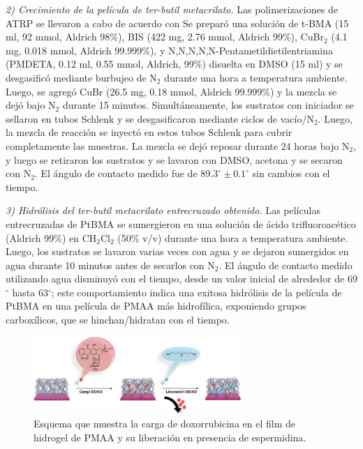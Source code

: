 \emph{2) Crecimiento de la pel\'icula de ter-butil metacrilato.}
 Las polimerizaciones de ATRP se llevaron a cabo de acuerdo con \cite{Brown2009} Se prepar\'o una soluci\'on de t-BMA (15 ml, 92 mmol, Aldrich 98\%), BIS (422 mg, 2.76 mmol, Aldrich 99\%), CuBr$_2$ (4.1 mg, 0.018 mmol, Aldrich 99.999\%), y N,N,N,N,N-Pentametildietilentriamina (PMDETA, 0.12 ml, 0.55 mmol, Aldrich, 99\%) disuelta en DMSO (15 ml) y se desgasific\'o mediante burbujeo de N$_2$ durante una hora a temperatura ambiente. Luego, se agregó CuBr (26.5 mg, 0.18 mmol, Aldrich 99.999\%) y la mezcla se dej\'o bajo N$_2$ durante 15 minutos. Simult\'aneamente, los sustratos con iniciador se sellaron en tubos Schlenk y se desgasificaron mediante ciclos de vac\'io/N$_2$. Luego, la mezcla de reacci\'on se inyect\'o en estos tubos Schlenk para cubrir completamente las muestras. La mezcla se dej\'o reposar durante 24 horas bajo N$_2$, y luego se retiraron los sustratos y se lavaron con DMSO, acetona y se secaron con N$_2$. El \'angulo de contacto medido fue de $89.3^\circ \pm 0.1^\circ$ sin cambios con el tiempo.

\emph{3) Hidr\'olisis del ter-butil metacrilato entrecruzado obtenido.}
 Las pel\'iculas entrecruzadas de PtBMA se sumergieron en una soluci\'on de \'acido trifluoroac\'etico (Aldrich 99\%) en CH$_2$Cl$_2$ (50\% v/v) durante una hora a temperatura ambiente. Luego, los sustratos se lavaron varias veces con agua y se dejaron sumergidos en agua durante 10 minutos antes de secarlos con N$_2$. El \'angulo de contacto medido utilizando agua disminuy\'o con el tiempo, desde un valor inicial de alrededor de 69$^\circ$ hasta 63$^\circ$; este comportamiento indica una exitosa hidr\'olisis de la pel\'icula de PtBMA en una pel\'icula de PMAA m\'as hidrofílica, exponiendo grupos carbox\'ilicos, que se hinchan/hidratan con el tiempo.


\begin{figure}[htb]
	\centering
	\includegraphics[width=0.7\textwidth]{Figures/graph-film/exp_doxo_load_scheme.pdf}
	\caption{Esquema que muestra la carga de doxorrubicina en el film de hidrogel de PMAA y su liberaci\'on en presencia de espermidina.}
	\label{fig:film:exp_doxo_scheme}
\end{figure}



